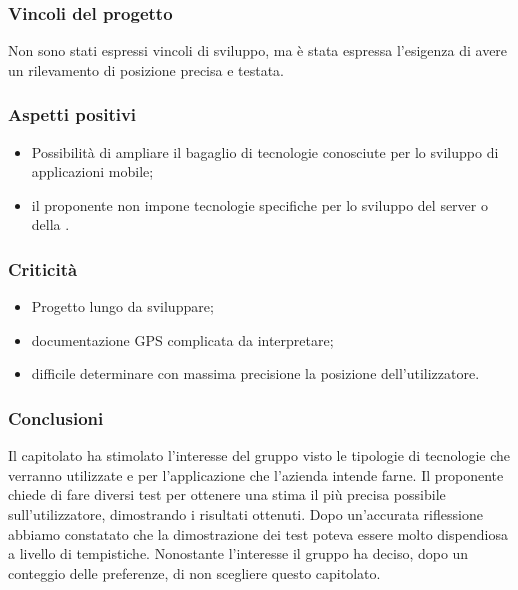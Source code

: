 	\subsubsection{Vincoli del progetto}
		Non sono stati espressi vincoli di sviluppo, ma è stata espressa l'esigenza di avere un rilevamento di posizione precisa e testata.

	\subsubsection{Aspetti positivi}
		\begin{itemize}
			\item Possibilità di ampliare il bagaglio di tecnologie conosciute per lo sviluppo di applicazioni mobile;
			\item il proponente non impone tecnologie specifiche per lo sviluppo del server o
			della .
		\end{itemize}

	\subsubsection{Criticità}
		\begin{itemize}
			\item Progetto lungo da sviluppare;
			\item documentazione GPS complicata da interpretare;
			\item difficile determinare con massima precisione la posizione dell'utilizzatore.
		\end{itemize}

	\subsubsection{Conclusioni}
		Il capitolato ha stimolato l'interesse del gruppo visto le tipologie di tecnologie che verranno utilizzate e per l'applicazione che l'azienda intende farne. Il proponente chiede di fare diversi test per ottenere una stima il più precisa possibile sull'utilizzatore, dimostrando i risultati ottenuti. Dopo un'accurata riflessione abbiamo constatato che la dimostrazione dei test poteva essere molto dispendiosa a livello di tempistiche. Nonostante l'interesse il gruppo ha deciso, dopo un conteggio delle preferenze, di non scegliere questo capitolato.
